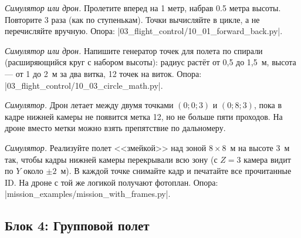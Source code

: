 \begin{taskbox}[(Б) Лестница]
\emph{Симулятор или дрон.} Пролетите вперед на 1 метр, набрав 0.5 метра высоты. Повторите 3 раза (как по ступенькам). Точки вычисляйте в цикле, а не перечисляйте вручную.
Опора: \fpath|03_flight_control/10_01_forward_back.py|.
\end{taskbox}

\begin{taskbox}[(П) Спираль]
\emph{Симулятор или дрон.} Напишите генератор точек для полета по спирали (расширяющийся круг с набором высоты): радиус растёт от 0,5 до 1,5~м, высота --- от 1 до 2~м за два витка, 12 точек на виток.
Опора: \fpath|03_flight_control/10_03_circle_math.py|.
\end{taskbox}

\begin{taskbox}[(П) Патруль]
\emph{Симулятор.} Дрон летает между двумя точками $(0; 0; 3)$ и $(0; 8; 3)$, пока в кадре нижней камеры не появится метка 12, но не больше пяти проходов. На дроне вместо метки можно взять препятствие по дальномеру.
\end{taskbox}

\begin{taskbox}
\emph{Симулятор.} Реализуйте полет <<змейкой>> над зоной $8 \times 8$~м на высоте 3~м так, чтобы кадры нижней камеры перекрывали всю зону (с $Z = 3$ камера видит по $Y$ около $\pm 2$~м). В каждой точке снимайте кадр и печатайте все прочитанные ID. На дроне с той же логикой получают фотоплан.
Опора: \fpath|mission_examples/mission_with_frames.py|.
\end{taskbox}

\subsection{Блок 4: Групповой полет}

